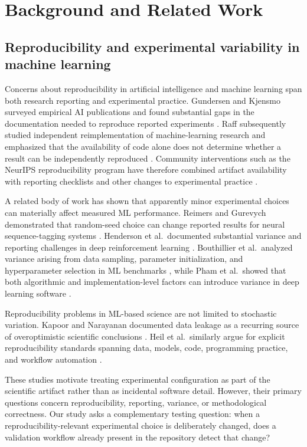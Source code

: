 \section{Background and Related Work}
\label{sec:related-work}

\subsection{Reproducibility and experimental variability in machine learning}
\label{sec:related-reproducibility}

Concerns about reproducibility in artificial intelligence and machine learning
span both research reporting and experimental practice. Gundersen and Kjensmo
surveyed empirical AI publications and found substantial gaps in the
documentation needed to reproduce reported experiments
\cite{gundersen2018reproducibility}. Raff subsequently studied independent
reimplementation of machine-learning research and emphasized that the
availability of code alone does not determine whether a result can be
independently reproduced \cite{raff2019reproducible}. Community interventions
such as the NeurIPS reproducibility program have therefore combined artifact
availability with reporting checklists and other changes to experimental
practice \cite{pineau2021improving}.

A related body of work has shown that apparently minor experimental choices can
materially affect measured ML performance. Reimers and Gurevych demonstrated
that random-seed choice can change reported results for neural sequence-tagging
systems \cite{reimers2017score}. Henderson et al.\ documented substantial
variance and reporting challenges in deep reinforcement learning
\cite{henderson2018matters}. Bouthillier et al.\ analyzed variance arising from
data sampling, parameter initialization, and hyperparameter selection in ML
benchmarks \cite{bouthillier2021variance}, while Pham et al.\ showed that both
algorithmic and implementation-level factors can introduce variance in deep
learning software \cite{pham2020variance}.

Reproducibility problems in ML-based science are not limited to stochastic
variation. Kapoor and Narayanan documented data leakage as a recurring source
of overoptimistic scientific conclusions \cite{kapoor2023leakage}. Heil et
al.\ similarly argue for explicit reproducibility standards spanning data,
models, code, programming practice, and workflow automation
\cite{heil2021standards}.

These studies motivate treating experimental configuration as part of the
scientific artifact rather than as incidental software detail. However, their
primary questions concern reproducibility, reporting, variance, or
methodological correctness. Our study asks a complementary testing question:
when a reproducibility-relevant experimental choice is deliberately changed,
does a validation workflow already present in the repository detect that
change?


